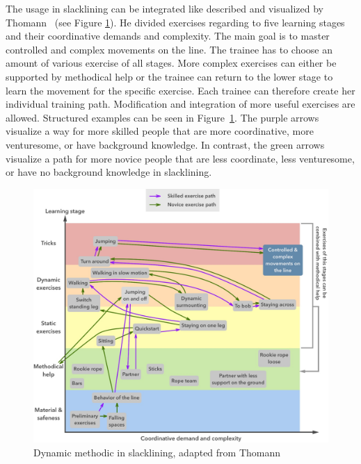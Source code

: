 The usage in slacklining can be integrated like described and visualized by Thomann~\cite{Thomann2013-aa} (see Figure \ref{fig:3_3_1_dynamicMethod}). He divided exercises regarding to five learning stages and their coordinative demands and complexity. The main goal is to master controlled and complex movements on the line. The trainee has to choose an amount of various exercise of all stages. More complex exercises can either be supported by methodical help or the trainee can return to the lower stage to learn the movement for the specific exercise. Each trainee can therefore create her individual training path. Modification and integration of more useful exercises are allowed. Structured examples can be seen in Figure~\ref{fig:3_3_1_dynamicMethod}. The purple arrows visualize a way for more skilled people that are more coordinative, more venturesome, or have background knowledge. In contrast, the green arrows visualize a path for more novice people that are less coordinate, less venturesome, or have no background knowledge in slacklining.
\begin{figure}[htb]
	\centering
	\begin{minipage}[t]{1\linewidth}
		\centering
		\includegraphics[width=1\linewidth]{Pictures/3_3_1_dynamicMethodBoth2}
		\caption{Dynamic methodic in slacklining, adapted from Thomann~\cite{Thomann2013-aa}}
		\label{fig:3_3_1_dynamicMethod}
	\end{minipage}
\end{figure}

